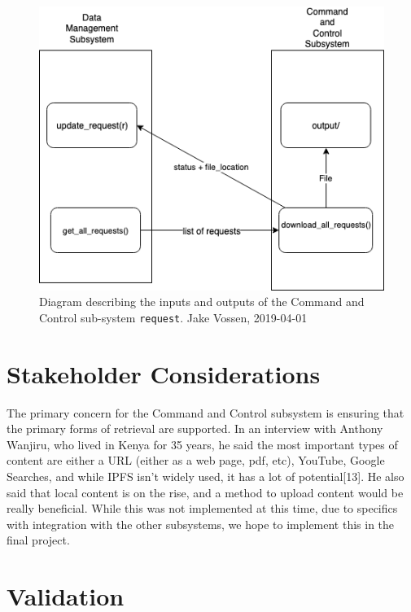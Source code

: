 \documentclass{article}
\begin{document}
\begin{figure}[h]
  \centering
  \includegraphics[scale=.5]{input-output.png}
  \caption{\begingroup \fontsize{10pt}{12pt}\selectfont Diagram
    describing the inputs and outputs of the Command and Control sub-system
    \texttt{request}. Jake Vossen, 2019-04-01 \endgroup}
\end{figure}

\section{Stakeholder Considerations}

The primary concern for the Command and Control subsystem is ensuring
that the primary forms of retrieval are supported. In an interview with
Anthony Wanjiru, who lived in Kenya for 35 years, he said the most
important types of content are either a URL (either as a web page,
pdf, etc), YouTube, Google Searches, and while IPFS isn't widely used,
it has a lot of potential[13]. He also said that local content is on
the rise, and a method to upload content would be really
beneficial. While this was not implemented at this time, due to
specifics with integration with the other subsystems, we hope to
implement this in the final project.

\section{Validation}
\end{document}
